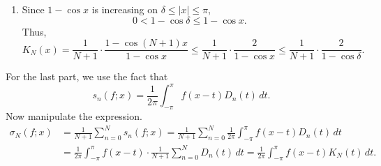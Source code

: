 \documentclass[12pt]{report}
\newcommand{\num}[1]{\item[\textbf{\sffamily #1}]}
\newcommand{\abs}[1]{\left| #1 \right|}
\renewcommand{\d}[1]{\,d{#1}}
\begin{document}
\begin{enumerate}
\begin{enumerate}
        \num{(c)} Since \(1 - \cos x\) is increasing on \(\delta \leq \abs{x} \leq \pi\),
        \[
            0 < 1- \cos \delta \leq 1 - \cos x.
        \]
        Thus,
        \[
            K_N(x) = \frac{1}{N+1} \cdot \frac{1 - \cos (N+1)x}{1 - \cos x} \leq \frac{1}{N+1} \cdot \frac{2}{1 - \cos x} \leq \frac{1}{N+1}\cdot \frac{2}{1 - \cos\delta}.
        \]
    \end{enumerate}

    For the last part, we use the fact that
    \[
        s_n(f; x) = \frac{1}{2\pi} \int_{-\pi}^\pi f(x-t) D_n(t)\d{t}.
    \]
    Now manipulate the expression.
    \[
        \begin{aligned}
            \sigma_N(f; x) & = \frac{1}{N+1}\sum_{n=0}^N s_n (f;x) = \frac{1}{N+1}\sum_{n=0}^N \frac{1}{2\pi} \int_{-\pi}^\pi f(x-t) D_n(t)\d{t}                         \\
                           & =\frac{1}{2\pi} \int_{-\pi}^\pi f(x - t) \cdot \frac{1}{N+1} \sum_{n=0}^N D_n(t)\d{t}  =\frac{1}{2\pi} \int_{-\pi}^\pi f(x- t) K_N(t)\d{t}.
        \end{aligned}
    \]


\end{enumerate}
\end{document}

